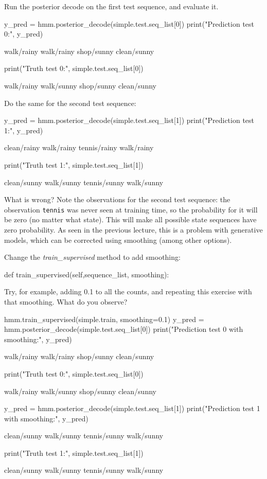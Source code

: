 \begin{exercise}
Run the posterior decode on the first test sequence, and evaluate it.
\begin{python}
y_pred = hmm.posterior_decode(simple.test.seq_list[0])
print("Prediction test 0:", y_pred)

walk/rainy walk/rainy shop/sunny clean/sunny

print("Truth test 0:", simple.test.seq_list[0])

walk/rainy walk/sunny shop/sunny clean/sunny 
\end{python}

Do the same for the second test sequence:
\begin{python}
y_pred = hmm.posterior_decode(simple.test.seq_list[1])
print("Prediction test 1:", y_pred)

clean/rainy walk/rainy tennis/rainy walk/rainy 

print("Truth test 1:", simple.test.seq_list[1])

clean/sunny walk/sunny tennis/sunny walk/sunny 
\end{python}

What is wrong? Note the observations for the second test sequence: the
observation {\tt tennis} was never seen at training time, so the probability for
it will be zero (no matter what state). This will make all possible state
sequences have zero probability.
As seen in the previous lecture, this is a problem with generative
models, which can be corrected using smoothing (among other
options).

Change the \emph{train\_supervised} method to add smoothing:
\begin{python}
def train_supervised(self,sequence_list, smoothing):
\end{python}

Try, for example, adding 0.1 to all the counts, and repeating this exercise with that smoothing. What do you observe?
\begin{python}
hmm.train_supervised(simple.train, smoothing=0.1)
y_pred = hmm.posterior_decode(simple.test.seq_list[0])
print("Prediction test 0 with smoothing:", y_pred)

walk/rainy walk/rainy shop/sunny clean/sunny 

print("Truth test 0:", simple.test.seq_list[0])

walk/rainy walk/sunny shop/sunny clean/sunny

y_pred = hmm.posterior_decode(simple.test.seq_list[1])
print("Prediction test 1 with smoothing:", y_pred)

clean/sunny walk/sunny tennis/sunny walk/sunny 

print("Truth test 1:", simple.test.seq_list[1])

clean/sunny walk/sunny tennis/sunny walk/sunny 
\end{python}
\end{exercise}

